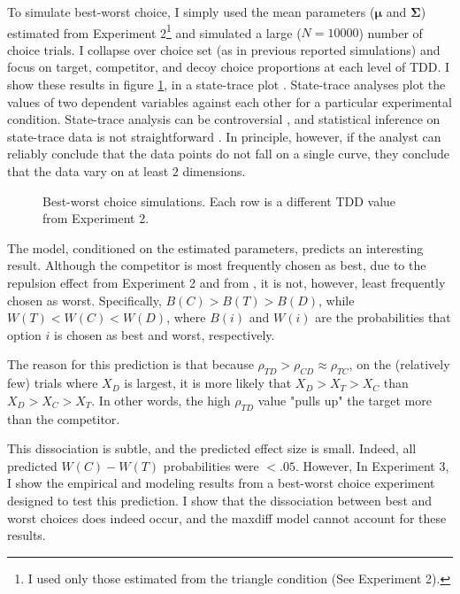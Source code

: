 To simulate best-worst choice, I simply used the mean parameters ($\boldsymbol{\mu}$ and $\boldsymbol{\Sigma}$) estimated from Experiment 2\footnote{I used only those estimated from the triangle condition (See Experiment 2).} and simulated a large ($N=10000$) number of choice trials. I collapse over choice set (as in previous reported simulations) and focus on target, competitor, and decoy choice proportions at each level of TDD. I show these results in figure \ref{fig:bw_sim}, in a state-trace plot \parencite{newell2008dimensions}. State-trace analyses plot the values of two dependent variables against each other for a particular experimental condition. State-trace analysis can be controversial \parencite{ashby2019state,ashby2022state,stephens2020state}, and statistical inference on state-trace data is not straightforward \parencite{sadil2018hierarchical,davis2016bayes}. In principle, however, if the analyst can reliably conclude that the data points do not fall on a single curve, they conclude that the data vary on at least $2$ dimensions.

\begin{figure}
   \caption{Best-worst choice simulations. Each row is a different TDD value from Experiment 2.}
   \label{fig:bw_sim}
\end{figure}

The model, conditioned on the estimated parameters, predicts an interesting result. Although the competitor is most frequently chosen as best, due to the repulsion effect from Experiment 2 and from \textcite{spektorWhenGoodLooks2018b}, it is not, however, least frequently chosen as worst. Specifically, $B(C)>B(T)>B(D)$, while $W(T)<W(C)<W(D)$, where $B(i)$ and $W(i)$ are the probabilities that option $i$ is chosen as best and worst, respectively.

The reason for this prediction is that because $\rho_{TD}>\rho_{CD}\approx\rho_{TC}$, on the (relatively few) trials where $X_{D}$ is largest, it is more likely that $X_{D}>X_{T}>X_{C}$ than $X_{D}>X_{C}>X_{T}$. In other words, the high $\rho_{TD}$ value "pulls up" the target more than the competitor.

This dissociation is subtle, and the predicted effect size is small. Indeed, all predicted $W(C)-W(T)$ probabilities were $<.05$. However, In Experiment 3, I show the empirical and modeling results from a best-worst choice experiment designed to test this prediction. I show that the dissociation between best and worst choices does indeed occur, and the maxdiff model cannot account for these results.

